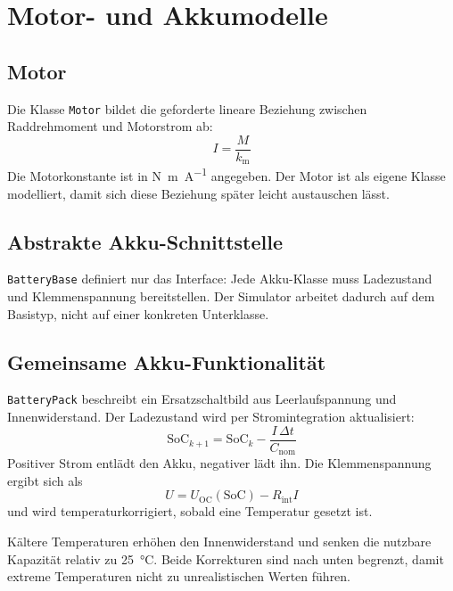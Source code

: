 \chapter{Motor- und Akkumodelle}
\label{ch:motor-akku}

\section{Motor}

Die Klasse \texttt{Motor} bildet die geforderte lineare Beziehung zwischen Raddrehmoment und Motorstrom ab:
\begin{equation}
I = \frac{M}{k_{\mathrm{m}}}
\end{equation}
Die Motorkonstante ist in \si{\newton\metre\per\ampere} angegeben. Der Motor ist als eigene Klasse modelliert, damit sich diese Beziehung später leicht austauschen lässt.

\section{Abstrakte Akku-Schnittstelle}

\texttt{BatteryBase} definiert nur das Interface: Jede Akku-Klasse muss Ladezustand und Klemmenspannung bereitstellen. Der Simulator arbeitet dadurch auf dem Basistyp, nicht auf einer konkreten Unterklasse.

\section{Gemeinsame Akku-Funktionalität}

\texttt{BatteryPack} beschreibt ein Ersatzschaltbild aus Leerlaufspannung und Innenwiderstand. Der Ladezustand wird per Stromintegration aktualisiert:
\begin{equation}
\mathrm{SoC}_{k+1} = \mathrm{SoC}_k - \frac{I\,\Delta t}{C_{\mathrm{nom}}}
\end{equation}
Positiver Strom entlädt den Akku, negativer lädt ihn. Die Klemmenspannung ergibt sich als
\begin{equation}
U = U_{\mathrm{OC}}(\mathrm{SoC}) - R_{\mathrm{int}} I
\end{equation}
und wird temperaturkorrigiert, sobald eine Temperatur gesetzt ist.

Kältere Temperaturen erhöhen den Innenwiderstand und senken die nutzbare Kapazität relativ zu \SI{25}{\celsius}. Beide Korrekturen sind nach unten begrenzt, damit extreme Temperaturen nicht zu unrealistischen Werten führen.

